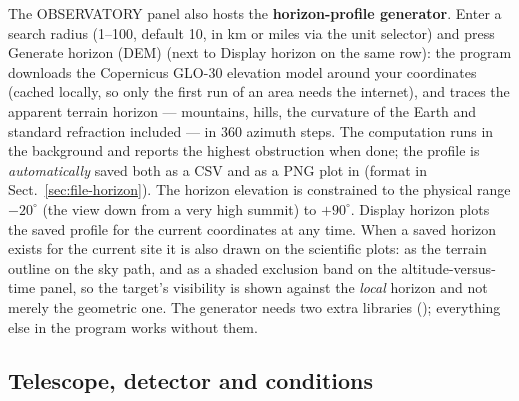 The OBSERVATORY panel also hosts the \textbf{horizon-profile generator}.
Enter a search radius (1--100, default 10, in km or miles via the unit
selector) and press \textsf{Generate horizon (DEM)} (next to
\textsf{Display horizon} on the same row): the program
downloads the Copernicus GLO-30 elevation model around your coordinates
(cached locally, so only the first run of an area needs the internet),
and traces the apparent terrain horizon --- mountains, hills, the
curvature of the Earth and standard refraction included --- in 360
azimuth steps. The computation runs in the background and reports the
highest obstruction when done; the profile is \emph{automatically} saved
both as a CSV and as a PNG plot in  (format in
Sect.~\ref{sec:file-horizon}). The horizon elevation is constrained to the
physical range $-20^\circ$ (the view down from a very high summit) to
$+90^\circ$. \textsf{Display horizon} plots the saved profile for the
current coordinates at any time. When a saved horizon exists for the
current site it is also drawn on the scientific plots: as the terrain
outline on the sky path, and as a shaded exclusion band on the
altitude-versus-time panel, so the target's visibility is shown against
the \emph{local} horizon and not merely the geometric one. The generator needs two
extra libraries (); everything else in
the program works without them.

\subsection{Telescope, detector and conditions}

